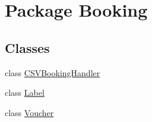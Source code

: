 \hypertarget{namespace_booking}{\section{Package Booking}
\label{namespace_booking}
}
\subsection*{Classes}
\begin{DoxyCompactItemize}
\item 
class \hyperlink{class_booking_1_1_c_s_v_booking_handler}{C\-S\-V\-Booking\-Handler}
\item 
class \hyperlink{class_booking_1_1_label}{Label}
\item 
class \hyperlink{class_booking_1_1_voucher}{Voucher}
\end{DoxyCompactItemize}

